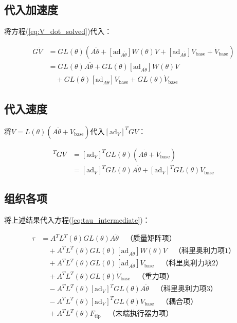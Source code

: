 \documentclass[12pt,a4paper]{article}
\begin{document}
\subsection{代入加速度}

将方程(\ref{eq:V_dot_solved})代入：

\begin{align}
G\dot{V} &= GL(\theta)\left(A\ddot{\theta} + [\text{ad}_{A\dot{\theta}}]W(\theta)V + [\text{ad}_{A\dot{\theta}}]V_{\text{base}} + \dot{V}_{\text{base}}\right) \\
&= GL(\theta)A\ddot{\theta} + GL(\theta)[\text{ad}_{A\dot{\theta}}]W(\theta)V \\
&\quad + GL(\theta)[\text{ad}_{A\dot{\theta}}]V_{\text{base}} + GL(\theta)\dot{V}_{\text{base}}
\end{align}

\subsection{代入速度}

将$V = L(\theta)(A\dot{\theta} + V_{\text{base}})$代入$[\text{ad}_V]^T GV$：

\begin{align}
[\text{ad}_V]^T GV &= [\text{ad}_V]^T GL(\theta)(A\dot{\theta} + V_{\text{base}}) \\
&= [\text{ad}_V]^T GL(\theta)A\dot{\theta} + [\text{ad}_V]^T GL(\theta)V_{\text{base}}
\end{align}

\subsection{组织各项}

将上述结果代入方程(\ref{eq:tau_intermediate})：

\begin{align}
\tau &= A^T L^T(\theta)GL(\theta)A\ddot{\theta} \quad \text{（质量矩阵项）} \\
&\quad + A^T L^T(\theta)GL(\theta)[\text{ad}_{A\dot{\theta}}]W(\theta)V \quad \text{（科里奥利力项1）} \\
&\quad + A^T L^T(\theta)GL(\theta)[\text{ad}_{A\dot{\theta}}]V_{\text{base}} \quad \text{（科里奥利力项2）} \\
&\quad + A^T L^T(\theta)GL(\theta)\dot{V}_{\text{base}} \quad \text{（重力项）} \\
&\quad - A^T L^T(\theta)[\text{ad}_V]^T GL(\theta)A\dot{\theta} \quad \text{（科里奥利力项3）} \\
&\quad - A^T L^T(\theta)[\text{ad}_V]^T GL(\theta)V_{\text{base}} \quad \text{（耦合项）} \\
&\quad + A^T L^T(\theta)F_{\text{tip}} \quad \text{（末端执行器力项）}
\end{align}
\end{document}
